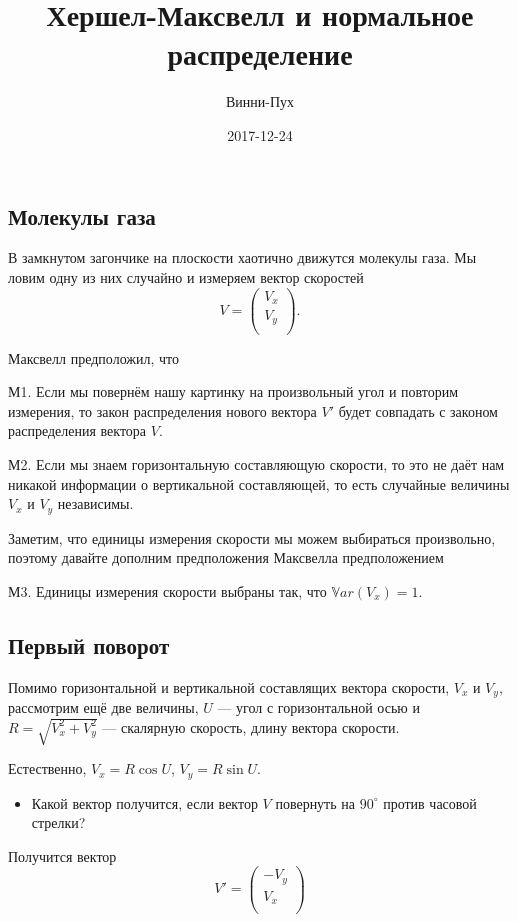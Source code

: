 \documentclass[11pt,russian,]{article}
\title{Хершел-Максвелл и нормальное распределение}
\author{Винни-Пух}
\date{2017-12-24}
\providecommand{\tightlist}{%
  \setlength{\itemsep}{0pt}\setlength{\parskip}{0pt}}
\newcommand{\Var}{\mathbb{V}ar}
\begin{document}
\maketitle

{
\setcounter{tocdepth}{2}
\tableofcontents
}
\subsection{Молекулы газа}\label{-}

В замкнутом загончике на плоскости хаотично движутся молекулы газа. Мы
ловим одну из них случайно и измеряем вектор скоростей \[
V = \begin{pmatrix}
V_x \\
V_y \\
\end{pmatrix}.
\]

Максвелл предположил, что

М1. Если мы повернём нашу картинку на произвольный угол и повторим
измерения, то закон распределения нового вектора \(V'\) будет совпадать
с законом распределения вектора \(V\).

М2. Если мы знаем горизонтальную составляющую скорости, то это не даёт
нам никакой информации о вертикальной составляющей, то есть случайные
величины \(V_x\) и \(V_y\) независимы.

Заметим, что единицы измерения скорости мы можем выбираться произвольно,
поэтому давайте дополним предположения Максвелла предположением

М3. Единицы измерения скорости выбраны так, что \(\Var(V_x)=1\).

\subsection{Первый поворот}\label{-}

Помимо горизонтальной и вертикальной составлящих вектора скорости,
\(V_x\) и \(V_y\), рассмотрим ещё две величины, \(U\) --- угол с
горизонтальной осью и \(R=\sqrt{V_x^2+V_y^2}\) --- скалярную скорость,
длину вектора скорости.

Естественно, \(V_x = R\cos U\), \(V_y = R\sin U\).

\begin{itemize}
\tightlist
\item
  Какой вектор получится, если вектор \(V\) повернуть на \(90^{\circ}\)
  против часовой стрелки?
\end{itemize}

Получится вектор \[
V'=\begin{pmatrix}
-V_y \\
V_x \\
\end{pmatrix}
\]
\end{document}
